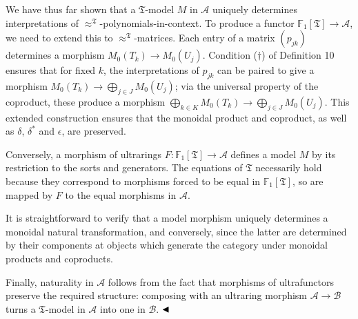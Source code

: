 \documentclass[10pt,a4paper]{amsart}
\begin{document}
We have thus far shown that a $\mathfrak{T}$-model $M$ in $\mathcal{A}$ uniquely determines interpretations of $\approx^{\mathfrak{T}}$-polynomials-in-context. To produce a functor $\mathbb{F}_{1}[\mathfrak{T}]\to\mathcal{A}$, we need to extend this to $\approx^{\mathfrak{T}}$-matrices. Each entry of a matrix $(p_{jk})$ determines a morphism $M_{0}(T_{k})\to M_{0}(U_{j})$. Condition (${\dagger}$) of Definition 10 ensures that for fixed $k$, the interpretations of $p_{jk}$ can be paired to give a morphism $M_{0}(T_{k})\to\bigoplus_{j\in J}M_{0}(U_{j})$; via the universal property of the coproduct, these produce a morphism $\bigoplus_{k\in K}M_{0}(T_{k})\to\bigoplus_{j\in J}M_{0}(U_{j})$. This extended construction ensures that the monoidal product and coproduct, as well as $\delta$, $\delta^{*}$ and $\epsilon$, are preserved.\par
 
 
 
Conversely, a morphism of ultrarings $F:\mathbb{F}_{1}[\mathfrak{T}]\to\mathcal{A}$ defines a model $M$ by its restriction to the sorts and generators. The equations of $\mathfrak{T}$ necessarily hold because they correspond to morphisms forced to be equal in $\mathbb{F}_{1}[\mathfrak{T}]$, so are mapped by $F$ to the equal morphisms in $\mathcal{A}$.\par
 
 
 
It is straightforward to verify that a model morphism uniquely determines a monoidal natural transformation, and conversely, since the latter are determined by their components at objects which generate the category under monoidal products and coproducts.\par
 
 
 
Finally, naturality in $\mathcal{A}$ follows from the fact that morphisms of ultrafunctors preserve the required structure: composing with an ultraring morphism $\mathcal{A}\to\mathcal{B}$ turns a $\mathfrak{T}$-model in $\mathcal{A}$ into one in $\mathcal{B}$. $\hfill\blacktriangleleft$\par
 
 
 
\end{document}
